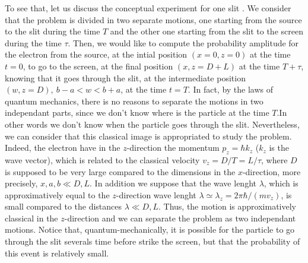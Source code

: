 \documentclass[12pt]{article}   %
\begin{document}
To see that, let us discuss the conceptual experiment for one slit \cite{FH}.
We consider that the problem is divided 
in two separate motions, one starting from the source to the slit during the time $T$
and the other one starting from the slit to the screen during the time $\tau$. 
Then, we would like to compute the probability amplitude for the electron
from the source, at the intial position $(x=0,z=0)$ at the time $t=0$, 
to go to the screen, at the final position $(x,z=D+L)$ at the time $T+\tau$, 
knowing that it goes through the slit, 
at the intermediate position $(w,z=D),\ b-a<w<b+a$, at the time $t=T$. 
In fact, by the laws of quantum mechanics, there is no reasons
to separate the motions in two independant parts, since we don't know
where is the particle at the time $T$.In other words we don't
know when the particle goes through the slit.
Nevertheless, we can consider that this classical image is appropriated
to study the problem. Indeed, the electron have in the $z$-direction 
the momentum $p_z=\hbar k_z$ ($k_z$ is the wave vector), 
which is related to the classical velocity $v_z=D/T=L/\tau$, 
where $D$ is supposed to be very large compared to the dimensions in the $x$-direction,
more precisely, $x,a,b\ll D,L$. In addition we suppose that the wave lenght $\lambda$, 
which is approximatively equal to the $z$-direction wave lenght $\lambda\simeq\lambda_z=2\pi\hbar/(mv_z)$, 
is small compared to the distances $\lambda\ll D,L$. 
Thus, the motion is approximatively classical in the $z$-direction 
and we can separate the problem as two independant motions.
Notice that, quantum-mechanically, it is possible for the particle to go through the slit 
severals time before strike the screen,\cite{Yabuki}
but that the probability of this event is relatively small. 
\end{document}
